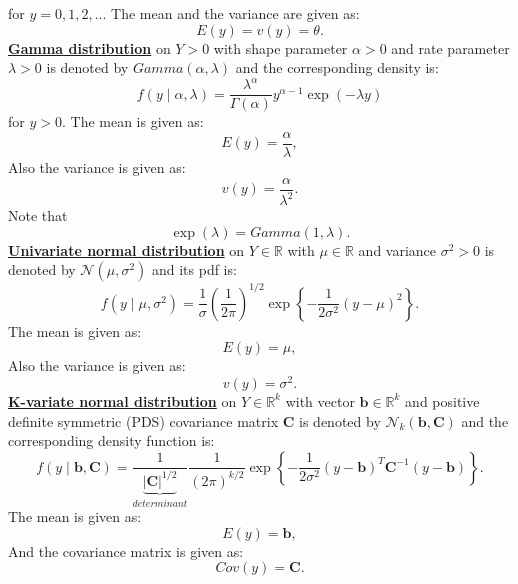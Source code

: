 \documentclass[lecture,12pt,]{pcms-l}
\numberwithin{section}{chapter}
\numberwithin{equation}{chapter}
\theoremstyle{plain}
\theoremstyle{definition}
\theoremstyle{definition}
\begin{document}
for $y=0,1,2,..$. The mean and the variance are given as\cite{Ross}:
\begin{equation}
E(y)=v(y)=\theta.
\end{equation}
\underline{\bf{Gamma distribution}} on $Y > 0$ with shape parameter $\alpha>0$ and rate parameter $\lambda>0$ is denoted by $Gamma(\alpha,\lambda)$ and the corresponding density is:
\begin{equation}
f(y \mid \alpha, \lambda)=\frac{\lambda^{\alpha}}{\Gamma(\alpha)} y^{\alpha-1} \exp(-\lambda y)
\end{equation}
for $y>0$. The mean is given as:
\begin{equation}
E(y)=\frac{\alpha}{\lambda},
\end{equation}
Also the variance is given as:
\begin{equation}
v(y)=\frac{\alpha}{\lambda^2}.
\end{equation}
Note that 
\begin{equation}
\exp(\lambda)=Gamma(1,\lambda).
\end{equation}
\underline{\bf{Univariate normal distribution}} on $Y \in \mathbb{R}$ with $\mu \in \mathbb{R}$ and variance $\sigma^2>0$ is denoted by $\mathcal{N}(\mu,\sigma^2)$ and its pdf is:
\begin{equation}
f(y \mid \mu, \sigma^2)=\frac{1}{\sigma} \left (  \frac{1}{2 \pi}\right )^{1/2} \exp \left \{ -\frac{1}{2 \sigma^2}(y -\mu)^2  \right \}.
\end{equation}
 The mean is given as:
\begin{equation}
E(y)=\mu,
\end{equation}
Also the variance is given as:
\begin{equation}
v(y)=\sigma^2.
\end{equation}
\underline{\bf{K-variate normal distribution}} on $Y \in \mathbb{R}^k$ with vector $\mathbf{b} \in \mathbb{R}^k$ and positive definite symmetric (PDS) covariance matrix $\mathbf{C}$ is denoted by $\mathcal{N}_k(\mathbf{b},\mathbf{C})$ and the corresponding density function is:
\begin{equation}
f(y \mid \mathbf{b},\mathbf{C})=\frac{1}{\underbrace{\left | \mathbf{C} \right |^{1/2}}_{determinant}}\frac{1}{(2 \pi)^{k/2}}\exp \left \{ -\frac{1}{2 \sigma^2}(y -\mathbf{b})^T \mathbf{C}^{-1}(y-\mathbf{b}) \right \}.
\end{equation}
 The mean is given as:
\begin{equation}
E(y)=\mathbf{b},
\end{equation}
And the covariance matrix is given as:
\begin{equation}
Cov(y)=\mathbf{C}.
\end{equation}
\end{document}
